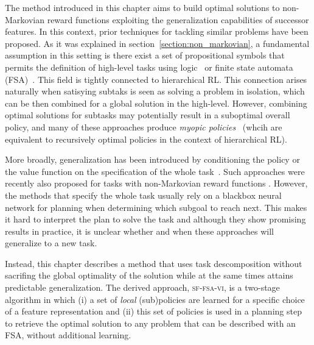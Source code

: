 
The method introduced in this chapter aims to build optimal solutions to non-Markovian reward functions exploiting the generalization capabilities of successor features. In this context, prior techniques for tackling similar problems have been proposed. As it was explained in section~\ref{section:non_markovian}, a fundamental assumption in this setting is there exist a set of propositional symbols that permits the definition of high-level tasks using logic~\citep{ToroIcarte2019, Vaezipoor2021} or finite state automata (FSA)~\citep{Icarte2022}. This field is tightly connected to hierarchical RL. This connection arises naturally when satisying subtaks is seen as solving a problem in isolation, which can be then combined for a global solution in the high-level. However, combining optimal solutions for subtasks may potentially result in a suboptimal overall policy, and many of these approaches produce \textit{myopic policies}~\citep{Vaezipoor2021} (whcih are equivalent to recursively optimal policies in the context of hierarchical RL).

More broadly, generalization has been introduced by conditioning the policy or the value function on the specification of the whole task~\citep{Schaul2015}. Such approaches were recently also proposed for tasks with non-Markovian reward functions \citep{Vaezipoor2021}. However, the methods that specify the whole task usually rely on a blackbox neural network for planning when determining which subgoal to reach next. This makes it hard to interpret the plan to solve the task and although they show promising results in practice, %
it is unclear whether and when these approaches will generalize to a new task. 

Instead, this chapter describes a method that uses task descomposition without sacrifing the global optimality of the solution while at the same times attains predictable generalization. The derived approach, \textsc{sf-fsa-vi}, is a two-stage algorithm in which (i) a set of \textit{local} (sub)policies are learned for a specific choice of a feature representation and (ii) this set of policies is used in a planning step to retrieve the optimal solution to any problem that can be described with an FSA, without additional learning.

